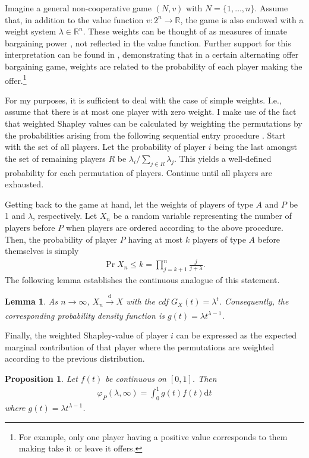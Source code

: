 \documentclass[a4paper]{article}
\newtheorem{proposition}{Proposition}
\newtheorem{lemma}{Lemma}
\newcommand{\dt}{\mathrm{d}t}
\begin{document}
Imagine a general non-cooperative game $(N, v)$ with $N = \{1, \dots, n\}$. Assume that, in addition to the value function $v : 2^n \to \mathbb{R}$, the game is also endowed with a weight system $\lambda \in \mathbb{R}^n$. These weights can be thought of as measures of innate bargaining power \parencite{shapley1953additive}, not reflected in the value function. Further support for this interpretation can be found in \textcite{hart1996bargaining}, demonstrating that in a certain alternating offer bargaining game, weights are related to the probability of each player making the offer.\footnote{For example, only one player having a positive value corresponds to them making take it or leave it offers.}

For my purposes, it is sufficient to deal with the case of simple weights. I.e., assume that there is at most one player with zero weight. I make use of the fact that weighted Shapley values can be calculated by weighting the permutations by the probabilities arising from the following sequential entry procedure \parencite{kalai1987weighted}. Start with the set of all players. Let the probability of player $i$ being the last amongst the set of remaining players $R$ be $\lambda_i / \sum_{j \in R} \lambda_j$. This yields a well-defined probability for each permutation of players. Continue until all players are exhausted.

Getting back to the game at hand, let the weights of players of type $A$ and $P$ be 1 and $\lambda$, respectively. Let $X_n$ be a random variable representing the number of players before $P$ when players are ordered according to the above procedure. Then, the probability of player $P$ having at most $k$ players of type $A$ before themselves is simply
\begin{align*}
    \Pr{X_n \leq k} = \prod_{j=k+1}^n \frac{j}{j + \lambda} .
\end{align*}
The following lemma establishes the continuous analogue of this statement.
\begin{lemma}
    \label{lem:entry_distr}
     As $n \to \infty$, $X_n \xrightarrow[]{\mathrm{d}} X$ with the cdf $G_X(t) = \lambda^t$. Consequently, the corresponding probability density function is $g(t) = \lambda t^{\lambda - 1}$.
\end{lemma}

Finally, the weighted Shapley-value of player $i$ can be expressed as the expected marginal contribution of that player where the permutations are weighted according to the previous distribution.
\begin{proposition}
    \label{prop:one_sided_weighted}
    Let $f(t)$ be continuous on $[0, 1]$. Then
    \begin{align*}
        \varphi_P(\lambda, \infty) = \int_0^1 g(t) f(t) \dt
    \end{align*}
    where $g(t) = \lambda t^{\lambda - 1}$.
\end{proposition}
\end{document}
